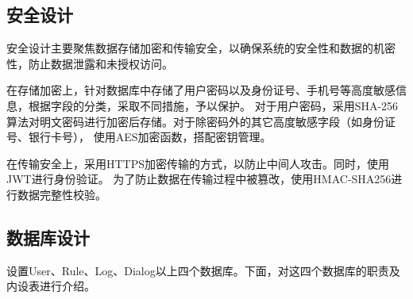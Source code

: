 \subsection{安全设计}
安全设计主要聚焦数据存储加密和传输安全，以确保系统的安全性和数据的机密性，防止数据泄露和未授权访问。

在存储加密上，针对数据库中存储了用户密码以及身份证号、手机号等高度敏感信息，根据字段的分类，采取不同措施，予以保护。
对于用户密码，采用SHA-256算法对明文密码进行加密后存储。对于除密码外的其它高度敏感字段（如身份证号、银行卡号），
使用AES加密函数，搭配密钥管理。

在传输安全上，采用HTTPS加密传输的方式，以防止中间人攻击。同时，使用JWT进行身份验证。
为了防止数据在传输过程中被篡改，使用HMAC-SHA256进行数据完整性校验。

\subsection{数据库设计}
设置User、Rule、Log、Dialog以上四个数据库。下面，对这四个数据库的职责及内设表进行介绍。


